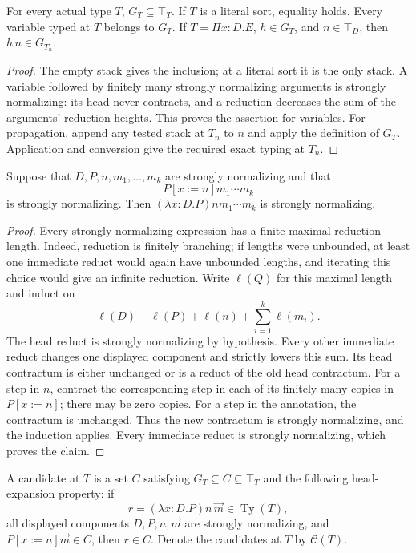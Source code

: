\begin{lemma}
\label{lem:test-properties}
For every actual type $T$, $G_T\subseteq\top_T$. If $T$ is a literal
sort, equality holds. Every variable typed at $T$ belongs to $G_T$.
If $T=\Pi x:D.E$, $h\in G_T$, and $n\in\top_D$, then
$h\,n\in G_{T_n}$.
\end{lemma}

\begin{proof}
The empty stack gives the inclusion; at a literal sort it is the only
stack. A variable followed by finitely many strongly normalizing
arguments is strongly normalizing: its head never contracts, and a
reduction decreases the sum of the arguments' reduction heights.
This proves the assertion for variables. For propagation, append any
tested stack at $T_n$ to $n$ and apply the definition of $G_T$.
Application and conversion give the required exact typing at $T_n$.
\end{proof}

\begin{lemma}
\label{lem:sn-head-expansion}
Suppose that $D,P,n,m_1,\ldots,m_k$ are strongly normalizing and that
\[
                    P[x:=n]m_1\cdots m_k
\]
is strongly normalizing. Then
$(\lambda x:D.P)n m_1\cdots m_k$ is strongly normalizing.
\end{lemma}

\begin{proof}
Every strongly normalizing expression has a finite maximal reduction
length. Indeed, reduction is finitely branching; if lengths were
unbounded, at least one immediate reduct would again have unbounded
lengths, and iterating this choice would give an infinite reduction.
Write $\ell(Q)$ for this maximal length and induct on
\[
        \ell(D)+\ell(P)+\ell(n)+\sum_{i=1}^k\ell(m_i).
\]
The head reduct is strongly normalizing by hypothesis. Every other
immediate reduct changes one displayed component and strictly lowers
this sum. Its head contractum is either unchanged or is a reduct of
the old head contractum. For a step in $n$, contract the corresponding
step in each of its finitely many copies in $P[x:=n]$; there may be
zero copies. For a step in the annotation, the contractum is unchanged.
Thus the new contractum is strongly normalizing, and the induction
applies. Every immediate reduct is strongly normalizing, which proves
the claim.
\end{proof}

\begin{definition}
\label{def:candidate}
A candidate at $T$ is a set $C$ satisfying
$G_T\subseteq C\subseteq\top_T$ and the following head-expansion
property: if
\[
 r=(\lambda x:D.P)n\,\vec m\in\operatorname{Ty}(T),
\]
all displayed components $D,P,n,\vec m$ are strongly normalizing, and
$P[x:=n]\vec m\in C$, then $r\in C$. Denote the candidates at $T$
by $\mathcal C(T)$.
\end{definition}


